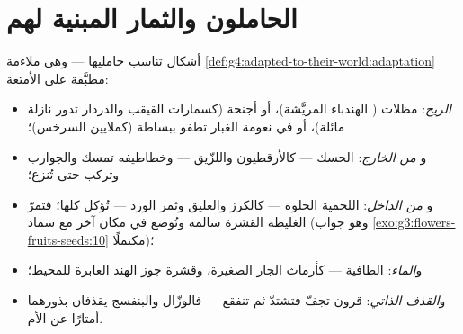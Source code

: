 \section{الحاملون والثمار المبنية لهم}

\begin{proposition}\label{prop:g6:how-plants-spread:builds}
أشكال   تناسب حامليها --- وهي ملاءمة
\cref{def:g4:adapted-to-their-world:adaptation} مطبَّقة على
الأمتعة:
\begin{itemize}
  \item \emph{الريح}: مظلات ( الهندباء المريَّشة)، أو أجنحة
        (كسمارات القيقب والدردار تدور نازلة مائلة)، أو  في
        نعومة الغبار تطفو ببساطة (كملايين  السرخس)؛
  \item و\emph{ من الخارج}: الحسك --- كالأرقطيون
        واللزّيق --- وخطاطيفه تمسك  والجوارب وتركب حتى
        تُنزع؛
  \item و\emph{ من الداخل}:  اللحمية الحلوة ---
        كالكرز والعليق وثمر الورد --- تُؤكل كلها؛ فتمرّ 
        الغليظة القشرة سالمة وتُوضع في مكان آخر مع سماد
        (وهو جواب \cref{exo:g3:flowers-fruits-seeds:10} مكتملًا)؛
  \item و\emph{الماء}:  الطافية --- كأرماث الجار الصغيرة،
        وقشرة جوز الهند العابرة للمحيط؛
  \item و\emph{القذف الذاتي}: قرون تجفّ فتشتدّ ثم تنفقع ---
        فالوزّال والبنفسج يقذفان بذورهما أمتارًا عن الأم.
\end{itemize}
\end{proposition}
\admitted

